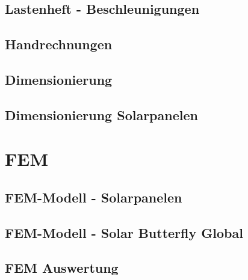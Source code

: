   \subsection{Lastenheft - Beschleunigungen}
  \label{e:Lastenheft}
  \subsection{Handrechnungen}
  \label{e:Handrechnungen}
  \subsection{Dimensionierung}
  \label{e:Dimensionierung}
  \subsection{Dimensionierung Solarpanelen}
  \label{e:Solarpanelen}



\section{FEM}
  \subsection{FEM-Modell - Solarpanelen}
  \label{e:Panelen}
  \subsection{FEM-Modell - Solar Butterfly Global}
  \label{e:Globales FEM}
  \subsection{FEM Auswertung}
  \label{e:FEM Auswertung}
